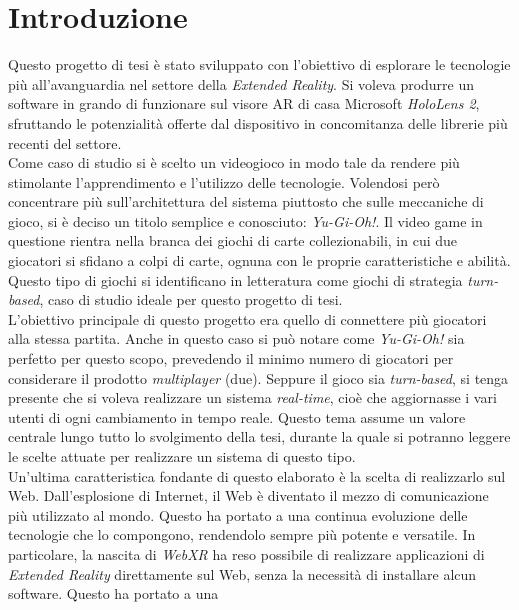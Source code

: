 \chapter{Introduzione}

Questo progetto di tesi è stato sviluppato con l'obiettivo di esplorare le tecnologie più all'avanguardia nel settore della \textit{Extended Reality}. Si voleva produrre un software
in grando di funzionare sul visore AR di casa Microsoft \textit{HoloLens 2}, sfruttando le potenzialità offerte dal dispositivo in concomitanza delle librerie più recenti
del settore.\\
\newline
Come caso di studio si è scelto un videogioco in modo tale da rendere più stimolante l'apprendimento e l'utilizzo delle tecnologie. Volendosi però concentrare più sull'architettura
del sistema piuttosto che sulle meccaniche di gioco, si è deciso un titolo semplice e conosciuto: \textit{Yu-Gi-Oh!}. Il video game in questione rientra nella branca dei giochi di
carte collezionabili, in cui due giocatori si sfidano a colpi di carte, ognuna con le proprie caratteristiche e abilità. Questo tipo di giochi si identificano in letteratura come
giochi di strategia \textit{turn-based}, caso di studio ideale per questo progetto di tesi.\\
\newline
L'obiettivo principale di questo progetto era quello di connettere più giocatori alla stessa partita. Anche in questo caso si può notare come \textit{Yu-Gi-Oh!} sia 
perfetto per questo scopo, prevedendo il minimo numero di giocatori per considerare il prodotto \textit{multiplayer} (due). Seppure il gioco sia \textit{turn-based}, si tenga presente
che si voleva realizzare un sistema \textit{real-time}, cioè che aggiornasse i vari utenti di ogni cambiamento in tempo reale. Questo tema assume un valore centrale lungo tutto lo
svolgimento della tesi, durante la quale si potranno leggere le scelte attuate per realizzare un sistema di questo tipo.\\
\newline
Un'ultima caratteristica fondante di questo elaborato è la scelta di realizzarlo sul Web. Dall'esplosione di Internet, il Web è diventato il mezzo di comunicazione più utilizzato
al mondo. Questo ha portato a una continua evoluzione delle tecnologie che lo compongono, rendendolo sempre più potente e versatile. In particolare, la nascita di \textit{WebXR} ha
reso possibile di realizzare applicazioni di \textit{Extended Reality} direttamente sul Web, senza la necessità di installare alcun software. Questo ha portato a una
